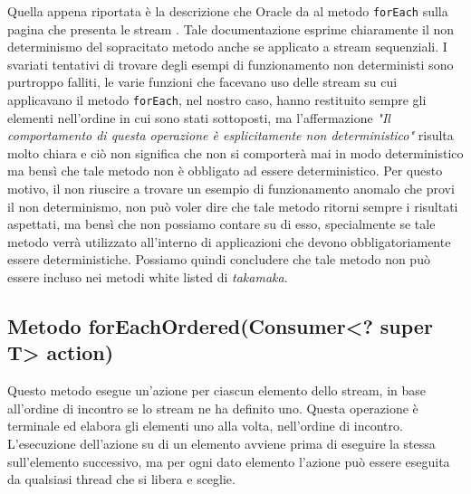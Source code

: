 			Quella appena riportata è la descrizione che Oracle da al metodo \lstinline|forEach| sulla pagina che presenta le stream \cite{java-8-stream}. Tale documentazione esprime chiaramente il non determinismo del sopracitato metodo anche se applicato a stream sequenziali. I svariati tentativi di trovare degli esempi di funzionamento non deterministi sono purtroppo falliti, le varie funzioni che facevano uso delle stream su cui applicavano il metodo \lstinline|forEach|, nel nostro caso, hanno restituito sempre gli elementi nell'ordine in cui sono stati sottoposti, ma l'affermazione \textit{"Il comportamento di questa operazione è esplicitamente non deterministico"} risulta molto chiara e ciò non significa che non si comporterà mai in modo deterministico ma bensì che tale metodo non è obbligato ad essere deterministico. Per questo motivo, il non riuscire a trovare un esempio di funzionamento anomalo che provi il non determinismo, non può voler dire che tale metodo ritorni sempre i risultati aspettati, ma bensì che non possiamo contare su di esso, specialmente se tale metodo verrà utilizzato all'interno di applicazioni che devono obbligatoriamente essere deterministiche. Possiamo quindi concludere che tale metodo non può essere incluso nei metodi white listed di \textit{takamaka}.
			
		\subsection{Metodo forEachOrdered(Consumer<? super T> action)}
			Questo metodo esegue un'azione per ciascun elemento dello stream, in base all'ordine di incontro se lo stream ne ha definito uno. Questa operazione è terminale ed elabora gli elementi uno alla volta, nell'ordine di incontro. L'esecuzione dell'azione su di un elemento avviene prima di eseguire la stessa sull'elemento successivo, ma per ogni dato elemento l'azione può essere eseguita da qualsiasi thread che si libera e sceglie.
			
